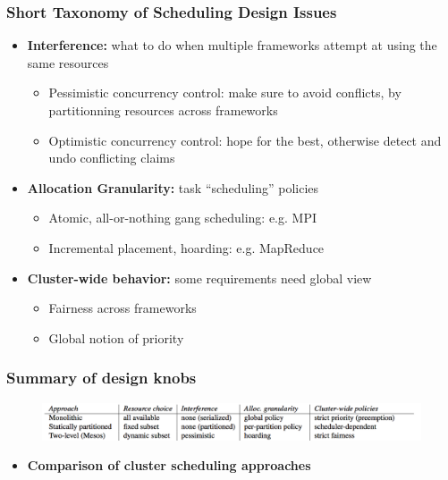 \begin{frame}\frametitle{Short Taxonomy of Scheduling Design Issues}
\begin{itemize}
	\item {\bf Interference:} what to do when multiple frameworks attempt at using the same resources
	\begin{itemize}
		\item Pessimistic concurrency control: make sure to avoid conflicts, by partitionning resources across frameworks
		\item Optimistic concurrency control: hope for the best, otherwise detect and undo conflicting claims
	\end{itemize}

\vspace{20pt}

	\item {\bf Allocation Granularity: } task ``scheduling'' policies
	\begin{itemize}
		\item Atomic, all-or-nothing gang scheduling: e.g. MPI
		\item Incremental placement, hoarding: e.g. MapReduce
	\end{itemize}

\vspace{20pt}

	\item {\bf Cluster-wide behavior: } some requirements need global view
	\begin{itemize}
		\item Fairness across frameworks
		\item Global notion of priority
	\end{itemize}
\end{itemize}
\end{frame}

\begin{frame}\frametitle{Summary of design knobs}
\begin{figure}[h]
  \includegraphics[scale=0.28]{./figures/intro_design}
  \label{fig:intro_design}
\end{figure}
\begin{itemize}
	\item {\bf Comparison of cluster scheduling approaches}
\end{itemize}
\end{frame}

